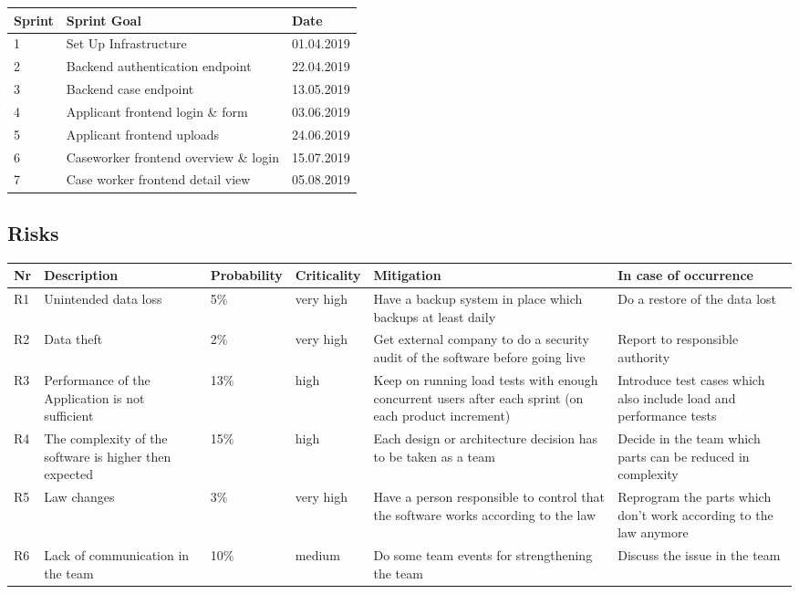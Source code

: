 \begin{table}[htb!]
\begin{tabular}{l|l|l}
\textbf{Sprint} & \textbf{Sprint Goal} & \textbf{Date} \\
\hline
1 & Set Up Infrastructure & 01.04.2019 \\
\hline
2 & Backend authentication endpoint & 22.04.2019 \\
\hline
3 & Backend case endpoint & 13.05.2019\\
\hline
4 & Applicant frontend login \& form & 03.06.2019\\
\hline
5 & Applicant frontend uploads & 24.06.2019\\
\hline
6 & Caseworker frontend overview \& login & 15.07.2019 \\
\hline
7 & Case worker frontend detail view & 05.08.2019\\
\hline
\end{tabular}
\end{table}

\newpage
\subsection{Risks}
\begin{table}[htb!]
\begin{tabularx}{\textwidth}{l|X|l|X|X|X}
\textbf{Nr} & \textbf{Description} & \textbf{Probability} & \textbf{Criticality} & \textbf{Mitigation} & \textbf{In case of occurrence} \\
\hline
R1 & Unintended data loss & 5\% & very high & Have a backup system in place which backups at least daily & Do a restore of the data lost \\
\hline
R2 & Data theft & 2\% & very high & Get external company to do a security audit of the software before going live & Report to responsible authority \\
\hline
R3 & Performance of the Application is not sufficient & 13\% & high & Keep on running load tests with enough concurrent users after each sprint (on each product increment) & Introduce test cases which also include load and performance tests \\
\hline
R4 & The complexity of the software is higher then expected & 15\% & high & Each design or architecture decision has to be taken as a team & Decide in the team which parts can be reduced in complexity\\
\hline
R5 & Law changes & 3\% & very high & Have a person responsible to control that the software works according to the law & Reprogram the parts which don't work according to the law anymore\\
\hline
R6 & Lack of communication in the team & 10\% & medium & Do some team events for strengthening the team & Discuss the issue in the team \\
\hline
\end{tabularx}
\end{table}
